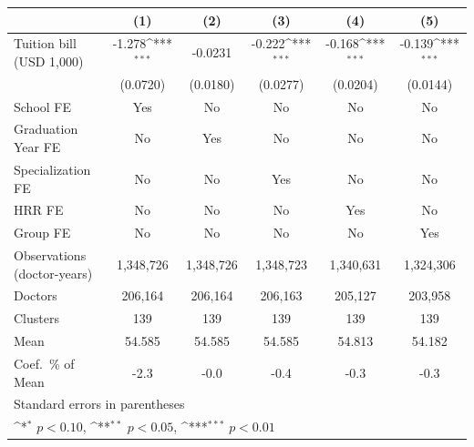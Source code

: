 {
\def\sym#1{\ifmmode^{#1}\else\(^{#1}\)\fi}
\begin{tabular}{l*{5}{c}}
\hline\hline
                    &\multicolumn{1}{c}{(1)}         &\multicolumn{1}{c}{(2)}         &\multicolumn{1}{c}{(3)}         &\multicolumn{1}{c}{(4)}         &\multicolumn{1}{c}{(5)}         \\
\hline
Tuition bill (USD 1,000)&      -1.278\sym{***}&     -0.0231         &      -0.222\sym{***}&      -0.168\sym{***}&      -0.139\sym{***}\\
                    &    (0.0720)         &    (0.0180)         &    (0.0277)         &    (0.0204)         &    (0.0144)         \\
[1em]
School FE           &         Yes         &          No         &          No         &          No         &          No         \\
[1em]
Graduation Year FE  &          No         &         Yes         &          No         &          No         &          No         \\
[1em]
Specialization FE   &          No         &          No         &         Yes         &          No         &          No         \\
[1em]
HRR FE              &          No         &          No         &          No         &         Yes         &          No         \\
[1em]
Group FE            &          No         &          No         &          No         &          No         &         Yes         \\
\hline
Observations (doctor-years)&   1,348,726         &   1,348,726         &   1,348,723         &   1,340,631         &   1,324,306         \\
Doctors             &     206,164         &     206,164         &     206,163         &     205,127         &     203,958         \\
Clusters            &         139         &         139         &         139         &         139         &         139         \\
Mean                &      54.585         &      54.585         &      54.585         &      54.813         &      54.182         \\
Coef.\ \% of Mean   &        -2.3         &        -0.0         &        -0.4         &        -0.3         &        -0.3         \\
\hline\hline
\multicolumn{6}{l}{\footnotesize Standard errors in parentheses}\\
\multicolumn{6}{l}{\footnotesize \sym{*} \(p<0.10\), \sym{**} \(p<0.05\), \sym{***} \(p<0.01\)}\\
\end{tabular}
}
